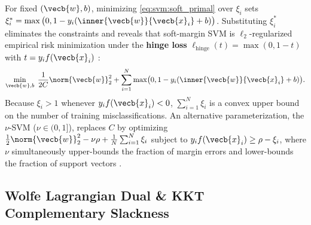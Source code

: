 \documentclass[../../../../master.tex]{subfiles}
\begin{document}
\begin{coremath}
For fixed $(\vecb{w}, b)$, minimizing \eqref{eq:svm:soft_primal} over $\xi_i$ sets $\xi_i^* = \max\big(0, 1 - y_i(\inner{\vecb{w}}{\vecb{x}_i} + b)\big)$. Substituting $\xi_i^*$ eliminates the constraints and reveals that soft-margin SVM is $\ell_2$-regularized empirical risk minimization under the \textbf{hinge loss} $\ell_{\mathrm{hinge}}(t) = \max(0, 1 - t)$ with $t = y_i f(\vecb{x}_i)$  :
\begin{equation}
  \min_{\vecb{w}, b} \; \frac{1}{2C}\norm{\vecb{w}}_2^2 + \sum_{i=1}^N \max\!\big(0, 1 - y_i(\inner{\vecb{w}}{\vecb{x}_i} + b)\big).
  \label{eq:svm:hinge_erm}
\end{equation}
Because $\xi_i > 1$ whenever $y_i f(\vecb{x}_i) < 0$, $\sum_{i=1}^N \xi_i$ is a convex upper bound on the number of training misclassifications. An alternative parameterization, the $\nu$-SVM ($\nu \in (0, 1]$), replaces $C$ by optimizing $\frac{1}{2}\norm{\vecb{w}}_2^2 - \nu \rho + \frac{1}{N}\sum_{i=1}^N \xi_i$ subject to $y_i f(\vecb{x}_i) \ge \rho - \xi_i$, where $\nu$ simultaneously upper-bounds the fraction of margin errors and lower-bounds the fraction of support vectors .
\end{coremath}

\subsection{Wolfe Lagrangian Dual \& KKT Complementary Slackness}
\end{document}
